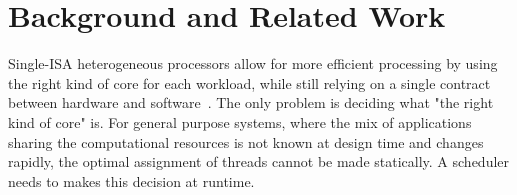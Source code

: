 \section{Background and Related Work}
\label{rw}

\begin{table}[htbp]
  \caption{Qualitative Analysis on Related Work}
  \begin{center}
  \label{rwt}
  \end{center}
\end{table}

Single-ISA heterogeneous processors allow for more efficient processing by using the right kind of core for each workload, while still relying on a single contract between hardware and software~\cite{kumar2004single,kumar2003single}. The only problem is deciding what "the right kind of core" is. For general purpose systems, where the mix of applications sharing the computational resources is not known at design time and changes rapidly, the optimal assignment of threads cannot be made statically. A scheduler needs to makes this decision at runtime.

